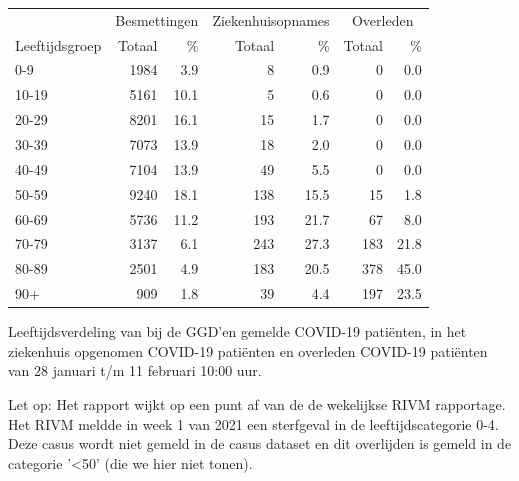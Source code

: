 \documentclass[
  english,
  man,floatsintext]{apa6}
\begin{document}
\begin{table}[H]
\centering\begingroup\fontsize{11}{13}\selectfont

\begin{threeparttable}
\begin{tabular}{lrrrrrr}
\toprule
\multicolumn{1}{c}{ } & \multicolumn{2}{c}{Besmettingen} & \multicolumn{2}{c}{Ziekenhuisopnames} & \multicolumn{2}{c}{Overleden} \\
\cmidrule(l{3pt}r{3pt}){2-3} \cmidrule(l{3pt}r{3pt}){4-5} \cmidrule(l{3pt}r{3pt}){6-7}
Leeftijdsgroep & Totaal & \% & Totaal & \% & Totaal & \%\\
\midrule
0-9 & 1984 & 3.9 & 8 & 0.9 & 0 & 0.0\\
10-19 & 5161 & 10.1 & 5 & 0.6 & 0 & 0.0\\
20-29 & 8201 & 16.1 & 15 & 1.7 & 0 & 0.0\\
30-39 & 7073 & 13.9 & 18 & 2.0 & 0 & 0.0\\
40-49 & 7104 & 13.9 & 49 & 5.5 & 0 & 0.0\\
50-59 & 9240 & 18.1 & 138 & 15.5 & 15 & 1.8\\
60-69 & 5736 & 11.2 & 193 & 21.7 & 67 & 8.0\\
70-79 & 3137 & 6.1 & 243 & 27.3 & 183 & 21.8\\
80-89 & 2501 & 4.9 & 183 & 20.5 & 378 & 45.0\\
90+ & 909 & 1.8 & 39 & 4.4 & 197 & 23.5\\
\bottomrule
\end{tabular}
\begin{tablenotes}
\item[1] Leeftijdsverdeling van bij de GGD’en gemelde COVID-19 patiënten, in het ziekenhuis opgenomen COVID-19 patiënten en overleden COVID-19 patiënten van 28 januari t/m 11 februari 10:00 uur.
\item[2] Let op: Het rapport wijkt op een punt af van de de wekelijkse RIVM rapportage. Het RIVM meldde in week 1 van 2021 een sterfgeval in de leeftijdscategorie 0-4. Deze casus wordt niet gemeld in de casus dataset en dit overlijden is gemeld in de categorie '<50' (die we hier niet tonen).
\end{tablenotes}
\end{threeparttable}
\endgroup{}
\end{table}

\newpage
\end{document}
